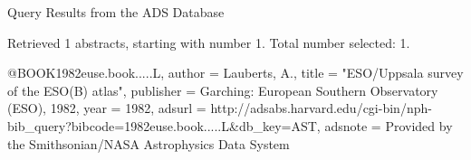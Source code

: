 Query Results from the ADS Database


Retrieved 1 abstracts, starting with number 1.  Total number selected: 1.

@BOOK{1982euse.book.....L,
   author = {{Lauberts}, A.},
    title = "{ESO/Uppsala survey of the ESO(B) atlas}",
publisher = {Garching: European Southern Observatory (ESO), 1982},
     year = 1982,
   adsurl = {http://adsabs.harvard.edu/cgi-bin/nph-bib_query?bibcode=1982euse.book.....L&db_key=AST},
  adsnote = {Provided by the Smithsonian/NASA Astrophysics Data System}
}


